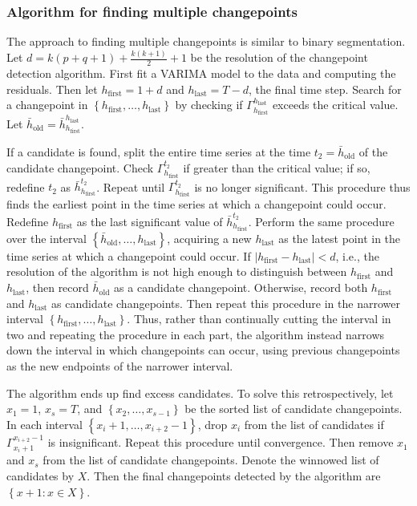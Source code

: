 \documentclass[conference,letterpaper]{IEEEtran}
\newcommand\set[1]{\left\{ #1 \right\}}
\newcommand\abs[1]{\left| #1 \right|}
\newcommand\hfirst{{h_{\mathrm{first}}}}
\newcommand\hlast{{h_{\mathrm{last}}}}
\begin{document}
\subsubsection{Algorithm for finding multiple changepoints}

The approach to finding multiple changepoints is similar to binary segmentation. Let $d=k(p+q+1)+\frac{k(k+1)}{2}+1$ be the resolution of the changepoint detection algorithm. First fit a VARIMA model to the data and computing the residuals. Then let $\hfirst=1+d$ and $\hlast=T-d$, the final time step. Search for a changepoint in $\set{\hfirst,\ldots,\hlast}$ by checking if $\Gamma_\hfirst^\hlast$ exceeds the critical value. Let $\bar h_{\mathrm{old}}=\bar h_\hfirst^\hlast$.

If a candidate is found, split the entire time series at the time $t_2=\bar h_{\mathrm{old}}$ of the candidate changepoint. Check $\Gamma_\hfirst^{t_2}$ if greater than the critical value; if so, redefine $t_2$ as $\bar h_\hfirst^{t_2}$. Repeat until $\Gamma_\hfirst^{t_2}$ is no longer significant. This procedure thus finds the earliest point in the time series at which a changepoint could occur. Redefine $\hfirst$ as the last significant value of $\bar h_\hfirst^{t_2}$. Perform the same procedure over the interval $\set{\bar h_{\mathrm{old}},\ldots,\hlast}$, acquiring a new $\hlast$ as the latest point in the time series at which a changepoint could occur. If $\abs{\hfirst-\hlast}<d$, i.e., the resolution of the algorithm is not high enough to distinguish between $\hfirst$ and $\hlast$, then record $\bar h_{\mathrm{old}}$ as a candidate changepoint. Otherwise, record both $\hfirst$ and $\hlast$ as candidate changepoints. Then repeat this procedure in the narrower interval $\set{\hfirst,\ldots,\hlast}$. Thus, rather than continually cutting the interval in two and repeating the procedure in each part, the algorithm instead narrows down the interval in which changepoints can occur, using previous changepoints as the new endpoints of the narrower interval.

The algorithm ends up find excess candidates. To solve this retrospectively, let $x_1=1$, $x_s=T$, and $\set{x_2,\ldots,x_{s-1}}$ be the sorted list of candidate changepoints. In each interval $\set{x_i+1,\ldots,x_{i+2}-1}$, drop $x_i$ from the list of candidates if $\Gamma_{x_i+1}^{x_{i+2}-1}$ is insignificant. Repeat this procedure until convergence. Then remove $x_1$ and $x_s$ from the list of candidate changepoints. Denote the winnowed list of candidates by $X$. Then the final changepoints detected by the algorithm are $\set{x+1:x\in X}$.
\end{document}
